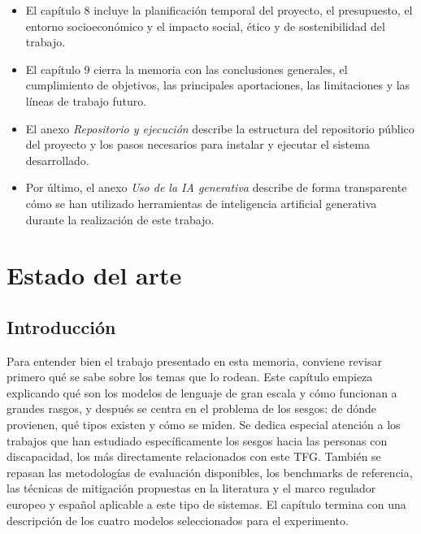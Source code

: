 \documentclass[12pt]{report} %
\renewcommand{\_}{\oldunderscore\allowbreak}
\begin{document}
\begin{itemize}
    \item El capítulo 8 incluye la planificación temporal del proyecto, el presupuesto, el entorno socioeconómico y el impacto social, ético y de sostenibilidad del trabajo.

    \item El capítulo 9 cierra la memoria con las conclusiones generales, el cumplimiento de objetivos, las principales aportaciones, las limitaciones y las líneas de trabajo futuro.

    \item El anexo \textit{Repositorio y ejecución} describe la estructura del repositorio público del proyecto y los pasos necesarios para instalar y ejecutar el sistema desarrollado.

    \item Por último, el anexo \textit{Uso de la IA generativa} describe de forma transparente cómo se han utilizado herramientas de inteligencia artificial generativa durante la realización de este trabajo.
\end{itemize}
\chapter{Estado del arte}

\section{Introducción}
Para entender bien el trabajo presentado en esta memoria, conviene revisar primero qué se sabe sobre los temas que lo rodean. Este capítulo empieza explicando qué son los modelos de lenguaje de gran escala y cómo funcionan a grandes rasgos, y después se centra en el problema de los sesgos: de dónde provienen, qué tipos existen y cómo se miden. Se dedica especial atención a los trabajos que han estudiado específicamente los sesgos hacia las personas con discapacidad, los más directamente relacionados con este TFG. También se repasan las metodologías de evaluación disponibles, los benchmarks de referencia, las técnicas de mitigación propuestas en la literatura y el marco regulador europeo y español aplicable a este tipo de sistemas. El capítulo termina con una descripción de los cuatro modelos seleccionados para el experimento.

\end{document}
